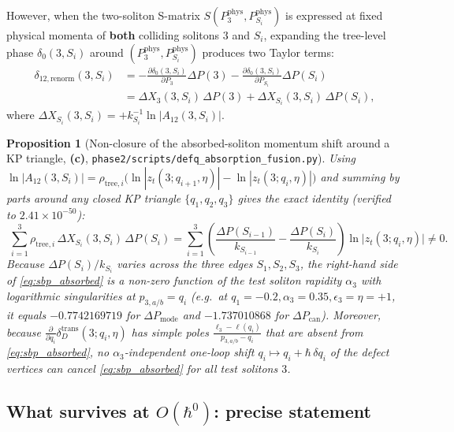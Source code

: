 \documentclass[11pt,a4paper]{article}
\newcommand{\Lc}{\textsf{\textbf{(c)}}}
\newcommand{\hb}{\hbar}
\newcommand{\sfus}{\texttt{phase2/\allowbreak scripts/\allowbreak defq\_\allowbreak absorption\_\allowbreak fusion.py}}
\newtheorem{proposition}{Proposition}[section]
\theoremstyle{remark}
\begin{document}
However, when the two-soliton S-matrix $S(P_3^{\mathrm{phys}},P_{S_i}^{\mathrm{phys}})$
is expressed at fixed physical momenta of \textbf{both} colliding solitons $3$
and $S_i$, expanding the tree-level phase $\delta_0(3,S_i)$ around
$(P_3^{\mathrm{phys}},P_{S_i}^{\mathrm{phys}})$ produces two Taylor terms:
\begin{align}\label{eq:two_taylor_terms}
  \delta_{12,\mathrm{renorm}}(3,S_i)
  &= -\frac{\partial\delta_0(3,S_i)}{\partial P_3}\Delta P(3)
    - \frac{\partial\delta_0(3,S_i)}{\partial P_{S_i}}\Delta P(S_i) \nonumber\\
  &= \Delta X_3(3,S_i)\,\Delta P(3) + \Delta X_{S_i}(3,S_i)\,\Delta P(S_i),
\end{align}
where $\Delta X_{S_i}(3,S_i) = +k_{S_i}^{-1}\ln|A_{12}(3,S_i)|$.

\begin{proposition}[Non-closure of the absorbed-soliton momentum shift around a KP triangle, \Lc, \sfus]\label{prop:absorbed_renorm}
Using $\ln|A_{12}(3,S_i)| = \rho_{\mathrm{tree},i}\big(\ln|z_t(3;q_{i+1},\eta)| - \ln|z_t(3;q_i,\eta)|\big)$
and summing by parts around any closed KP triangle $\{q_1,q_2,q_3\}$ gives the
exact identity (verified to $2.41\times 10^{-50}$):
\begin{equation}\label{eq:sbp_absorbed}
  \boxed{\;
  \sum_{i=1}^3 \rho_{\mathrm{tree},i}\,\Delta X_{S_i}(3,S_i)\,\Delta P(S_i)
  = \sum_{i=1}^3 \left(\frac{\Delta P(S_{i-1})}{k_{S_{i-1}}} - \frac{\Delta P(S_i)}{k_{S_i}}\right)\ln\big|z_t(3;q_i,\eta)\big| \ne 0.
  \;}
\end{equation}
Because $\Delta P(S_i)/k_{S_i}$ varies across the three edges $S_1,S_2,S_3$, the
right-hand side of \eqref{eq:sbp_absorbed} is a non-zero function of the test
soliton rapidity $\alpha_3$ with logarithmic singularities at $p_{3,a/b}=q_i$
(e.g.\ at $q_1=-0.2,\alpha_3=0.35,\epsilon_3=\eta=+1$, it equals $-0.7742169719$
for $\Delta P_{\mathrm{mode}}$ and $-1.737010868$ for $\Delta P_{\mathrm{can}}$).
Moreover, because $\frac{\partial}{\partial q_i}\delta_D^{\mathrm{trans}}(3;q_i,\eta)$
has simple poles $\frac{\ell_3-\ell(q_i)}{p_{3,a/b}-q_i}$ that are absent from
\eqref{eq:sbp_absorbed}, no $\alpha_3$-independent one-loop shift $q_i \mapsto q_i + \hb\,\delta q_i$
of the defect vertices can cancel \eqref{eq:sbp_absorbed} for all test solitons $3$.
\end{proposition}

\subsection{What survives at \texorpdfstring{$O(\hb^0)$}{O(hbar\^0)}: precise statement}
\end{document}
